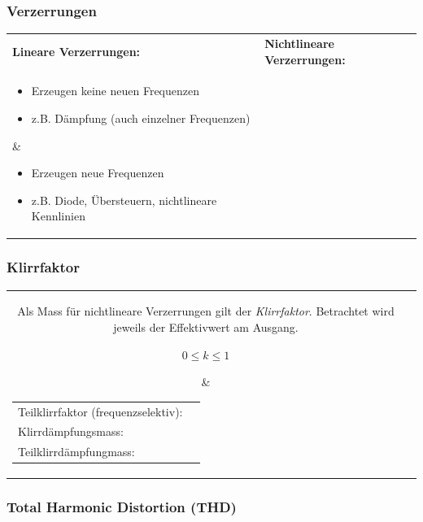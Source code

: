 		\subsubsection{Verzerrungen }
		
			\begin{tabular}{ll}
				\textbf{Lineare Verzerrungen:}
			&	\textbf{Nichtlineare Verzerrungen:}
			\\
				\parbox{9cm}{
					\begin{itemize}
						\item Erzeugen keine neuen Frequenzen
						\item z.B. Dämpfung (auch einzelner Frequenzen)
					\end{itemize}}
			&	\parbox{9cm}{
					\begin{itemize}
						\item Erzeugen neue Frequenzen
						\item z.B. Diode, Übersteuern, nichtlineare Kennlinien
					\end{itemize}}
			\\
			\end{tabular}
			
			
		\subsubsection{Klirrfaktor }
	
			\begin{tabularx}{\textwidth}{cX}
				\parbox{9cm}{
					Als Mass für nichtlineare Verzerrungen gilt der \textit{Klirrfaktor}. Betrachtet wird jeweils der Effektivwert am Ausgang.
					\begin{center}
						 $ 0 \leq k \leq 1$ 
					\end{center}
				}
			&	\parbox{9cm}{
					\begin{tabular}{ll}
						Teilklirrfaktor (frequenzselektiv):
					&	\fbox{$k_m =  \frac {U_m} {\sqrt{ U_1^2+ U_2^2 + \ldots + U_n^2} }$}
					\\
						Klirrdämpfungsmass:
					& 	\fbox{$a_k = 20 \log \left( \frac1k \right)$}
					\\
						Teilklirrdämpfungmass:
					& 	\fbox{$a_k = 20 \log \left( \frac{1}{k_m} \right)$}
					\end{tabular}
				}
			\end{tabularx}

		
		\subsubsection{Total Harmonic Distortion (THD) }
		
